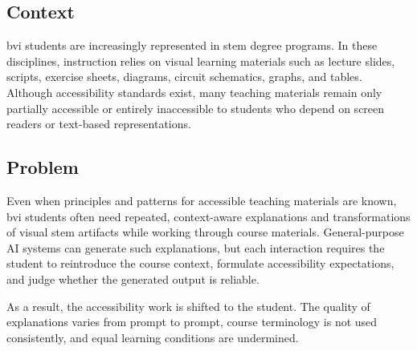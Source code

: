 
\patternSix

\subsection*{Context}

\ac{bvi} students are increasingly represented in \ac{stem} degree programs. In these disciplines, instruction relies on visual learning materials such as lecture slides, scripts, exercise sheets, diagrams, circuit schematics, graphs, and tables. Although accessibility standards exist, many teaching materials remain only partially accessible or entirely inaccessible to students who depend on screen readers or text-based representations.


\subsection*{Problem}

Even when principles and patterns for accessible teaching materials are known, \ac{bvi} students often need repeated, context-aware explanations and transformations of visual \ac{stem} artifacts while working through course materials. General-purpose AI systems can generate such explanations, but each interaction requires the student to reintroduce the course context, formulate accessibility expectations, and judge whether the generated output is reliable.

As a result, the accessibility work is shifted to the student. The quality of explanations varies from prompt to prompt, course terminology is not used consistently, and equal learning conditions are undermined.


